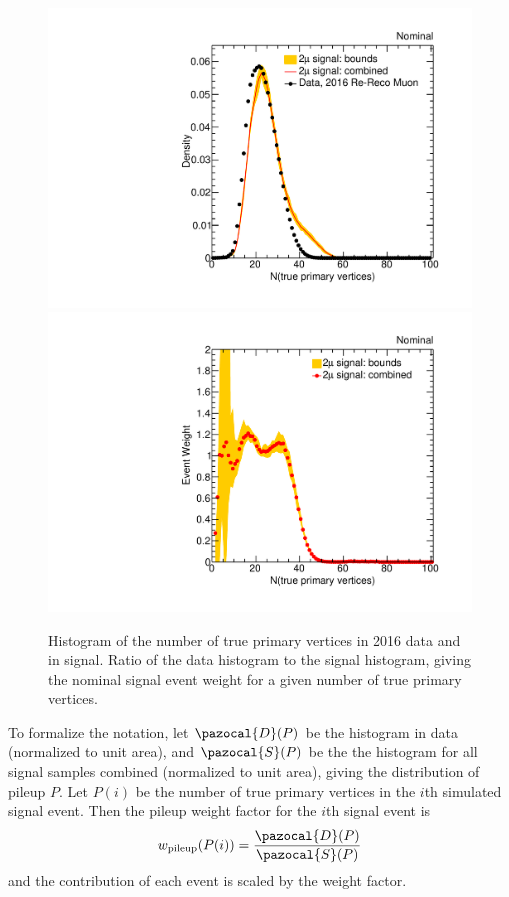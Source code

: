 \begin{figure}[htpb]
  \centering
  \includegraphics[width=\DSquareWidth]{figures/displaced/PU_distributionNom.pdf}
  \hspace*{-2em}
  \includegraphics[width=\DSquareWidth]{figures/displaced/PU_weightNom.pdf}
  \caption[Histograms of the number of true primary vertices in 2016 data and in \twoMu signal, and graph of their ratios.]{ Histogram of the number of true primary vertices in 2016 data and in \twoMu signal.  Ratio of the data histogram to the signal histogram, giving the nominal signal event weight for a given number of true primary vertices.}
  \label{fig:dd:pileup}
\end{figure}

To formalize the notation, let $\pazocal{D}(P)$ be the histogram in data (normalized to unit area), and $\pazocal{S}(P)$ be the the histogram for all signal samples combined (normalized to unit area), giving the distribution of pileup $P$.
Let $P(i)$ be the number of true primary vertices in the $i$th simulated signal event.
Then the pileup weight factor for the $i$th signal event is
\begin{equation}
  w_\text{pileup}(P(i)) = \frac{\pazocal{D}(P)}{\pazocal{S}(P)}
  \label{eq:dd:pileupweight}
\end{equation}
and the contribution of each event is scaled by the weight factor.

